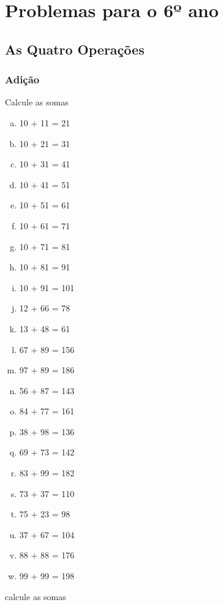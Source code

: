 
\chapter{Problemas para o 6º ano}
\section{As Quatro Operações}
\subsection{Adição}


\item Calcule as somas
\begin{multicols}{4}
\begin{enumerate}[a)]
	\item 10 + 11 = 21
	\item 10 + 21 = 31
	\item 10 + 31 = 41
	\item 10 + 41 = 51
	\item 10 + 51 = 61
	\item 10 + 61 = 71
	\item 10 + 71 = 81
	\item 10 + 81 = 91
	\item 10 + 91 = 101
	\item 12 + 66 = 78
	\item 13 + 48 = 61
	\item 67 + 89 = 156
	\item 97 + 89 = 186
	\item 56 + 87 = 143
	\item 84 + 77 = 161
	\item 38 + 98 = 136
	\item 69 + 73 = 142
	\item 83 + 99 = 182
	\item 73 + 37 = 110
	\item 75 + 23 = 98
	\item 37 + 67 = 104
	\item 88 + 88 = 176
	\item 99 + 99 = 198
\end{enumerate}
\end{multicols}

\item calcule as somas


